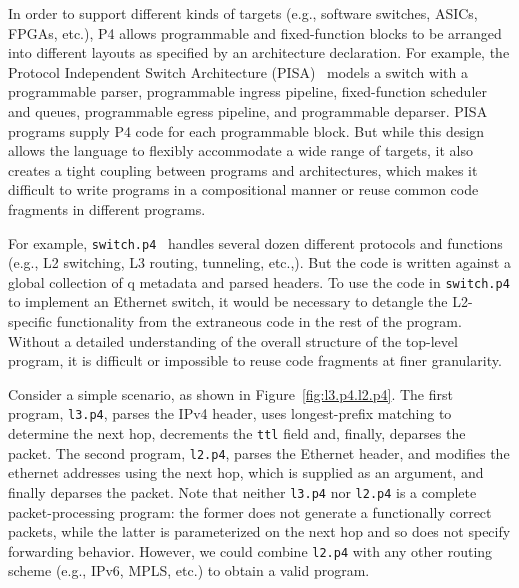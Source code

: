 \documentclass{hotnets19}
\begin{document}
In order to support different kinds of targets (e.g., software
switches, ASICs, FPGAs, etc.), P4 allows programmable and
fixed-function blocks to be arranged into different layouts as
specified by an architecture declaration. For example, the Protocol
Independent Switch Architecture
(PISA)~\cite{Bosshart:2013:FMF:2486001.2486011} models a switch with a
programmable parser, programmable ingress pipeline, fixed-function
scheduler and queues, programmable egress pipeline, and programmable
deparser. PISA programs supply P4 code for each programmable block.
But while this design allows the language to flexibly accommodate a
wide range of targets, it also creates a tight coupling between
programs and architectures, which makes it difficult to write programs
in a compositional manner or reuse common code fragments in different
programs.

For example, \texttt{switch.p4}~\cite{switch.p4} handles several dozen
different protocols and functions (e.g., L2 switching, L3 routing,
tunneling, etc.,). But the code is written against a global collection
of q metadata and parsed headers. To use the code in
\texttt{switch.p4} to implement an Ethernet switch, it would be
necessary to detangle the L2-specific functionality from the
extraneous code in the rest of the program. Without a detailed
understanding of the overall structure of the top-level program, it is
difficult or impossible to reuse code fragments at finer granularity.

Consider a simple scenario, as shown in Figure~\ref{fig:l3.p4.l2.p4}.
The first program, \texttt{l3.p4}, parses the IPv4 header, uses
longest-prefix matching to determine the next hop, decrements the
\texttt{ttl} field and, finally, deparses the packet. The second
program, \texttt{l2.p4}, parses the Ethernet header, and modifies the
ethernet addresses using the next hop, which is supplied as an
argument, and finally deparses the packet. Note that neither
\texttt{l3.p4} nor \texttt{l2.p4} is a complete packet-processing
program: the former does not generate a functionally correct packets,
while the latter is parameterized on the next hop and so does not
specify forwarding behavior. However, we could combine \texttt{l2.p4}
with any other routing scheme (e.g., IPv6, MPLS, etc.) to obtain a
valid program. 
\end{document}
